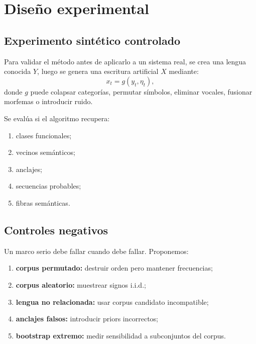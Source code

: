 \documentclass[11pt,a4paper]{article}
\newcommand{\1}{\mathbf{1}}
\numberwithin{equation}{section}
\begin{document}
\section{Diseño experimental}

\subsection{Experimento sintético controlado}

Para validar el método antes de aplicarlo a un sistema real, se crea una lengua conocida \(Y\), luego se genera una escritura artificial \(X\) mediante:
\begin{equation}
    x_t = g(y_t,\eta_t),
\end{equation}
donde \(g\) puede colapsar categorías, permutar símbolos, eliminar vocales, fusionar morfemas o introducir ruido.

Se evalúa si el algoritmo recupera:
\begin{enumerate}[label=(\roman*)]
    \item clases funcionales;
    \item vecinos semánticos;
    \item anclajes;
    \item secuencias probables;
    \item fibras semánticas.
\end{enumerate}

\subsection{Controles negativos}

Un marco serio debe fallar cuando debe fallar. Proponemos:
\begin{enumerate}[label=(\roman*)]
    \item \textbf{corpus permutado:} destruir orden pero mantener frecuencias;
    \item \textbf{corpus aleatorio:} muestrear signos i.i.d.;
    \item \textbf{lengua no relacionada:} usar corpus candidato incompatible;
    \item \textbf{anclajes falsos:} introducir priors incorrectos;
    \item \textbf{bootstrap extremo:} medir sensibilidad a subconjuntos del corpus.
\end{enumerate}
\end{document}
